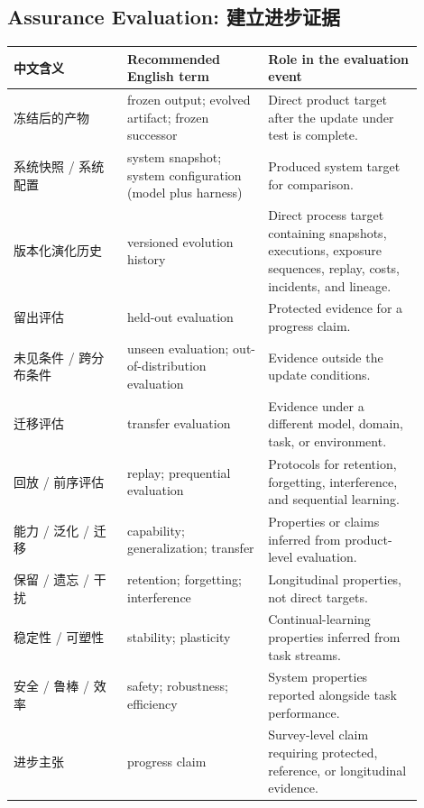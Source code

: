 \subsection*{Assurance Evaluation: 建立进步证据}
\begin{tabular}{p{0.25\linewidth} p{0.31\linewidth} p{0.34\linewidth}}
\textbf{中文含义} & \textbf{Recommended English term} & \textbf{Role in the evaluation event} \\
\hline
冻结后的产物 & frozen output; evolved artifact; frozen successor & Direct product target after the update under test is complete. \\
系统快照 / 系统配置 & system snapshot; system configuration (model plus harness) & Produced system target for comparison. \\
版本化演化历史 & versioned evolution history & Direct process target containing snapshots, executions, exposure sequences, replay, costs, incidents, and lineage. \\
留出评估 & held-out evaluation & Protected evidence for a progress claim. \\
未见条件 / 跨分布条件 & unseen evaluation; out-of-distribution evaluation & Evidence outside the update conditions. \\
迁移评估 & transfer evaluation & Evidence under a different model, domain, task, or environment. \\
回放 / 前序评估 & replay; prequential evaluation & Protocols for retention, forgetting, interference, and sequential learning. \\
能力 / 泛化 / 迁移 & capability; generalization; transfer & Properties or claims inferred from product-level evaluation. \\
保留 / 遗忘 / 干扰 & retention; forgetting; interference & Longitudinal properties, not direct targets. \\
稳定性 / 可塑性 & stability; plasticity & Continual-learning properties inferred from task streams. \\
安全 / 鲁棒 / 效率 & safety; robustness; efficiency & System properties reported alongside task performance. \\
进步主张 & progress claim & Survey-level claim requiring protected, reference, or longitudinal evidence. \\
\end{tabular}

